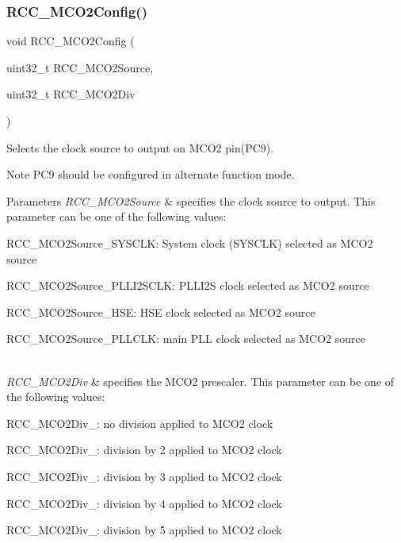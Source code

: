 \subsubsection{\texorpdfstring{R\+C\+C\+\_\+\+M\+C\+O2\+Config()}{RCC\_MCO2Config()}}
{\footnotesize\ttfamily void R\+C\+C\+\_\+\+M\+C\+O2\+Config (\begin{DoxyParamCaption}\item[{uint32\+\_\+t}]{R\+C\+C\+\_\+\+M\+C\+O2\+Source,  }\item[{uint32\+\_\+t}]{R\+C\+C\+\_\+\+M\+C\+O2\+Div }\end{DoxyParamCaption})}



Selects the clock source to output on M\+C\+O2 pin(\+P\+C9). 

\begin{DoxyNote}{Note}
P\+C9 should be configured in alternate function mode. 
\end{DoxyNote}

\begin{DoxyParams}{Parameters}
{\em R\+C\+C\+\_\+\+M\+C\+O2\+Source} & specifies the clock source to output. This parameter can be one of the following values\+: \begin{DoxyItemize}
\item R\+C\+C\+\_\+\+M\+C\+O2\+Source\+\_\+\+S\+Y\+S\+C\+LK\+: System clock (S\+Y\+S\+C\+LK) selected as M\+C\+O2 source \item R\+C\+C\+\_\+\+M\+C\+O2\+Source\+\_\+\+P\+L\+L\+I2\+S\+C\+LK\+: P\+L\+L\+I2S clock selected as M\+C\+O2 source \item R\+C\+C\+\_\+\+M\+C\+O2\+Source\+\_\+\+H\+SE\+: H\+SE clock selected as M\+C\+O2 source \item R\+C\+C\+\_\+\+M\+C\+O2\+Source\+\_\+\+P\+L\+L\+C\+LK\+: main P\+LL clock selected as M\+C\+O2 source \end{DoxyItemize}
\\
\hline
{\em R\+C\+C\+\_\+\+M\+C\+O2\+Div} & specifies the M\+C\+O2 prescaler. This parameter can be one of the following values\+: \begin{DoxyItemize}
\item R\+C\+C\+\_\+\+M\+C\+O2\+Div\+\_\+: no division applied to M\+C\+O2 clock \item R\+C\+C\+\_\+\+M\+C\+O2\+Div\+\_\+: division by 2 applied to M\+C\+O2 clock \item R\+C\+C\+\_\+\+M\+C\+O2\+Div\+\_\+: division by 3 applied to M\+C\+O2 clock \item R\+C\+C\+\_\+\+M\+C\+O2\+Div\+\_\+: division by 4 applied to M\+C\+O2 clock \item R\+C\+C\+\_\+\+M\+C\+O2\+Div\+\_\+: division by 5 applied to M\+C\+O2 clock \end{DoxyItemize}
\\
\hline
\end{DoxyParams}

